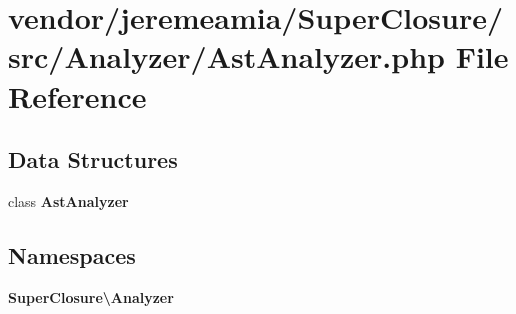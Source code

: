 \section{vendor/jeremeamia/\+Super\+Closure/src/\+Analyzer/\+Ast\+Analyzer.php File Reference}
\label{_ast_analyzer_8php}
\subsection*{Data Structures}
\begin{DoxyCompactItemize}
\item 
class {\bf Ast\+Analyzer}
\end{DoxyCompactItemize}
\subsection*{Namespaces}
\begin{DoxyCompactItemize}
\item 
 {\bf Super\+Closure\textbackslash{}\+Analyzer}
\end{DoxyCompactItemize}

